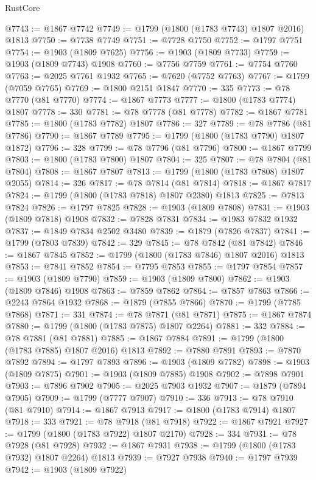 \begin{lexlean}{RustCore}
\begin{coremodule}
@7743 := @1867 @7742
@7749 := @1799 (@1800 (@1783 @7743) @1807 @2016) @1813
@7750 := @7738 @7749
@7751 := @7728 @7750
@7752 := @1797 @7751
@7754 := @1903 (@1809 @7625)
@7756 := @1903 (@1809 @7733)
@7759 := @1903 (@1809 @7743) @1908
@7760 := @7756 @7759
@7761 := @7754 @7760
@7763 := @2025 @7761 @1932
@7765 := @7620 (@7752 @7763)
@7767 := @1799 (@7059 @7765)
@7769 := @1800 @2151 @1847
@7770 := 335
@7773 := @78 @7770 (@81 @7770)
@7774 := @1867 @7773
@7777 := @1800 (@1783 @7774) @1807
@7778 := 330
@7781 := @78 @7778 (@81 @7778)
@7782 := @1867 @7781
@7785 := @1800 (@1783 @7782) @1807
@7786 := 327
@7789 := @78 @7786 (@81 @7786)
@7790 := @1867 @7789
@7795 := @1799 (@1800 (@1783 @7790) @1807 @1872)
@7796 := 328
@7799 := @78 @7796 (@81 @7796)
@7800 := @1867 @7799
@7803 := @1800 (@1783 @7800) @1807
@7804 := 325
@7807 := @78 @7804 (@81 @7804)
@7808 := @1867 @7807
@7813 := @1799 (@1800 (@1783 @7808) @1807 @2055)
@7814 := 326
@7817 := @78 @7814 (@81 @7814)
@7818 := @1867 @7817
@7824 := @1799 (@1800 (@1783 @7818) @1807 @2380) @1813
@7825 := @7813 @7824
@7826 := @1797 @7825
@7828 := @1903 (@1809 @7808)
@7831 := @1903 (@1809 @7818) @1908
@7832 := @7828 @7831
@7834 := @1983 @7832 @1932
@7837 := @1849 @7834 @2502 @3480
@7839 := @1879 (@7826 @7837)
@7841 := @1799 (@7803 @7839)
@7842 := 329
@7845 := @78 @7842 (@81 @7842)
@7846 := @1867 @7845
@7852 := @1799 (@1800 (@1783 @7846) @1807 @2016) @1813
@7853 := @7841 @7852
@7854 := @7795 @7853
@7855 := @1797 @7854
@7857 := @1903 (@1809 @7790)
@7859 := @1903 (@1809 @7800)
@7862 := @1903 (@1809 @7846) @1908
@7863 := @7859 @7862
@7864 := @7857 @7863
@7866 := @2243 @7864 @1932
@7868 := @1879 (@7855 @7866)
@7870 := @1799 (@7785 @7868)
@7871 := 331
@7874 := @78 @7871 (@81 @7871)
@7875 := @1867 @7874
@7880 := @1799 (@1800 (@1783 @7875) @1807 @2264)
@7881 := 332
@7884 := @78 @7881 (@81 @7881)
@7885 := @1867 @7884
@7891 := @1799 (@1800 (@1783 @7885) @1807 @2016) @1813
@7892 := @7880 @7891
@7893 := @7870 @7892
@7894 := @1797 @7893
@7896 := @1903 (@1809 @7782)
@7898 := @1903 (@1809 @7875)
@7901 := @1903 (@1809 @7885) @1908
@7902 := @7898 @7901
@7903 := @7896 @7902
@7905 := @2025 @7903 @1932
@7907 := @1879 (@7894 @7905)
@7909 := @1799 (@7777 @7907)
@7910 := 336
@7913 := @78 @7910 (@81 @7910)
@7914 := @1867 @7913
@7917 := @1800 (@1783 @7914) @1807
@7918 := 333
@7921 := @78 @7918 (@81 @7918)
@7922 := @1867 @7921
@7927 := @1799 (@1800 (@1783 @7922) @1807 @2170)
@7928 := 334
@7931 := @78 @7928 (@81 @7928)
@7932 := @1867 @7931
@7938 := @1799 (@1800 (@1783 @7932) @1807 @2264) @1813
@7939 := @7927 @7938
@7940 := @1797 @7939
@7942 := @1903 (@1809 @7922)

\end{coremodule}
\end{lexlean}
